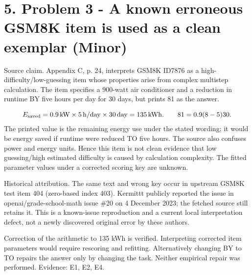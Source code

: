 \documentclass[10pt]{article}
\begin{document}
\section*{5. Problem 3 - A known erroneous GSM8K item is used as a clean exemplar (Minor)}
Source claim. Appendix C, p. 24, interprets GSM8K ID7876 as a high-difficulty/low-guessing item whose properties arise from complex multistep calculation. The item specifies a 900-watt air conditioner and a reduction in runtime BY five hours per day for 30 days, but prints 81 as the answer.\par
\[E_{\rm saved}=0.9\,{\rm kW}\times5\,{\rm h/day}\times30\,{\rm day}=135\,{\rm kWh}.\qquad81=0.9(8-5)30.\] The printed value is the remaining energy use under the stated wording; it would be energy saved if runtime were reduced TO five hours. The source also confuses power and energy units. Hence this item is not clean evidence that low guessing/high estimated difficulty is caused by calculation complexity. The fitted parameter values under a corrected scoring key are unknown.\par
Historical attribution. The same text and wrong key occur in upstream GSM8K test item 404 (zero-based index 403). Kermittt publicly reported the issue in openai/grade-school-math issue \#20 on 4 December 2023; the fetched source still retains it. This is a known-issue reproduction and a current local interpretation defect, not a newly discovered original error by these authors.\par
Correction of the arithmetic to 135 kWh is verified. Interpreting corrected item parameters would require rescoring and refitting. Alternatively changing BY to TO repairs the answer only by changing the task. Neither empirical repair was performed. Evidence: E1, E2, E4.\par
\end{document}
